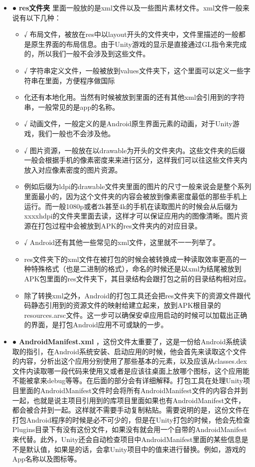 \documentclass[9pt, b5paper]{article}
\begin{document}
\begin{itemize}
\begin{itemize}
\end{itemize}
\item ● \textbf{res文件夹} 里面一般放的是xml文件以及一些图片素材文件。xml文件一般来说有以下几种：
\begin{itemize}
\item √ 布局文件，被放在res中以layout开头的文件夹中，文件里描述的一般都是原生界面的布局信息。由于Unity游戏的显示是直接通过GL指令来完成的，所以我们一般不会涉及到这些文件。
\item √ 字符串定义文件，一般被放到values文件夹下，这个里面可以定义一些字符串在里面，方便程序做国际
\item 化还有本地化用。当然有时候被放到里面的还有其他xml会引用到的字符串，一般常见的是app的名称。
\item √ 动画文件，一般定义的是Android原生界面元素的动画，对于Unity游戏，我们一般也不会涉及他。
\item √ 图片资源，一般放在以drawable为开头的文件夹内。这些文件夹的后缀一般会根据手机的像素密度来来进行区分，这样我们可以往这些文件夹内放入对应像素密度的图片资源。
\item 例如后缀为ldpi的drawable文件夹里面的图片的尺寸一般来说会是整个系列里面最小的，因为这个文件夹的内容会被放到像素密度最低的那些手机上运行。而一般1080p或者2k甚至4k的手机在读取图片的时候会从后缀为xxxxhdpi的文件夹里面去读，这样才可以保证应用内的图像清晰。图片资源在打包过程中会被放到APK的res文件夹内的对应目录。
\item √ Android还有其他一些常见的xml文件，这里就不一一列举了。
\item res文件夹下的xml文件在被打包的时候会被转换成一种读取效率更高的一种特殊格式（也是二进制的格式），命名的时候还是以xml为结尾被放到APK包里面的res文件夹下，其目录结构会跟打包之前的目录结构相对应。
\item 除了转换xml之外，Android的打包工具还会把res文件夹下的资源文件跟代码静态引用到的资源文件的映射给建立起来，放到APK根目录的resources.arsc文件。这一步可以确保安卓应用启动的时候可以加载出正确的界面，是打包Android应用不可或缺的一步。
\end{itemize}
\item ● \textbf{AndroidManifest.xml} ，这份文件太重要了，这是一份给Android系统读取的指引，在Android系统安装、启动应用的时候，他会首先来读取这个文件的内容，分析出这个应用分别使用了那些基本的元素，以及应该从classes.dex文件内读取哪一段代码来使用又或者是应该往桌面上放哪个图标，这个应用能不能被拿来debug等等。在后面的部分会有详细解释。打包工具在处理Unity项目里面的AndroidManifest文件时会将所有AndroidManifest文件的内容合并到一起，也就是说主项目引用到的库项目里面如果也有AndroidManifest文件，都会被合并到一起。这样就不需要手动复制粘贴。需要说明的是，这份文件在打包Android程序的时候是必不可少的，但是在Unity打包的时候，他会先检查Plugins目录下有没有这份文件，如果没有就会用一个自带的AndroidManifest来代替。此外，Unity还会自动检查项目中AndroidManifest里面的某些信息是不是默认值，如果是的话，会拿Unity项目中的值来进行替换。例如，游戏的App名称以及图标等。

\end{itemize}
\end{document}
